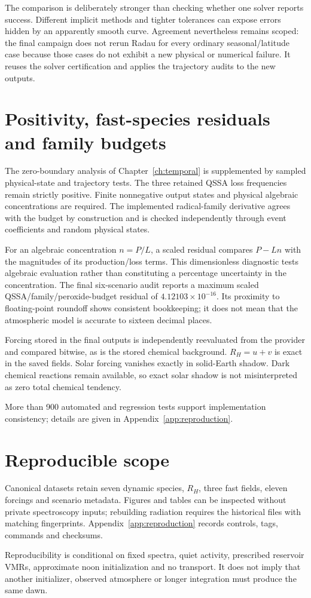 The comparison is deliberately stronger than checking whether one solver reports success. Different implicit methods and tighter tolerances can expose errors hidden by an apparently smooth curve. Agreement nevertheless remains scoped: the final campaign does not rerun Radau for every ordinary seasonal/latitude case because those cases do not exhibit a new physical or numerical failure. It reuses the solver certification and applies the trajectory audits to the new outputs.

\section{Positivity, fast-species residuals and family budgets}
The zero-boundary analysis of Chapter~\ref{ch:temporal} is supplemented by sampled physical-state and trajectory tests. The three retained QSSA loss frequencies remain strictly positive. Finite nonnegative output states and physical algebraic concentrations are required. The implemented radical-family derivative agrees with the budget by construction and is checked independently through event coefficients and random physical states.

For an algebraic concentration $n=P/L$, a scaled residual compares $P-Ln$ with the magnitudes of its production/loss terms. This dimensionless diagnostic tests algebraic evaluation rather than constituting a percentage uncertainty in the concentration. The final six-scenario audit reports a maximum scaled QSSA/family/peroxide-budget residual of $4.12103\times10^{-16}$. Its proximity to floating-point roundoff shows consistent bookkeeping; it does not mean that the atmospheric model is accurate to sixteen decimal places.

Forcing stored in the final outputs is independently reevaluated from the provider and compared bitwise, as is the stored chemical background. $R_H=u+v$ is exact in the saved fields. Solar forcing vanishes exactly in solid-Earth shadow. Dark chemical reactions remain available, so exact solar shadow is not misinterpreted as zero total chemical tendency.

More than 900 automated and regression tests support implementation consistency; details are given in Appendix~\ref{app:reproduction}.

\section{Reproducible scope}
Canonical datasets retain seven dynamic species, $R_H$, three fast fields, eleven forcings and scenario metadata. Figures and tables can be inspected without private spectroscopy inputs; rebuilding radiation requires the historical files with matching fingerprints. Appendix~\ref{app:reproduction} records controls, tags, commands and checksums.

Reproducibility is conditional on fixed spectra, quiet activity, prescribed reservoir VMRs, approximate noon initialization and no transport. It does not imply that another initializer, observed atmosphere or longer integration must produce the same dawn.
